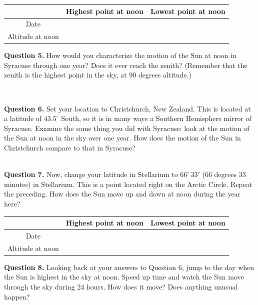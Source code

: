 \documentclass[11pt]{article}
\begin{document}
\vspace{1cm}
\begin{center}
\begin{tabular}{|c| c |c|}
\hline
 & Highest point at noon & Lowest point at noon \\
\hline
Date & & \\
\hline
Altitude at noon & & \\
\hline
\end{tabular}
\normalsize
\end{center}


\textbf{Question 5.} 
How would you characterize the motion of the Sun at noon in Syracuse through one year? Does it ever reach the zenith? (Remember that the zenith is the highest point in the sky, at 90 degrees altitude.)

\vspace*{1.5cm}
\hrulefill\\

\newpage

\textbf{Question 6.}
Set your location to Christchurch, New Zealand. This is located at a latitude of $43.5^\circ$ South, so it is in many ways a Southern Hemisphere mirror of Syracuse. Examine the same thing you did with Syracuse: look at the motion of the 
Sun at noon in the sky over one year. How does the motion of the Sun in Christchurch compare to that in Syracuse?

\vspace*{1.5cm}
\hrulefill\\
\textbf{Question 7.} 
Now, change your latitude in Stellarium to $66^\circ\,33'$ (66 degrees 33 minutes) in Stellarium. This is a point located right on the Arctic Circle. Repeat the preceding. How does the 
Sun move up and down at noon during the year here?
\renewcommand{\arraystretch}{2}
\vspace{1cm}
\begin{center}
\begin{tabular}{|c| c |c|}
\hline 
& Highest point at noon & Lowest point at noon \\
\hline
Date & & \\
\hline
Altitude at noon & & \\
\hline
\end{tabular}
\normalsize
\end{center}
\textbf{Question 8.} 
Looking back at your answers to Question 6, jump to the day when the Sun is highest in the sky at noon. Speed up time and watch
the Sun move through the sky during 24 hours. How does it move? Does anything unusual happen?
\end{document}

